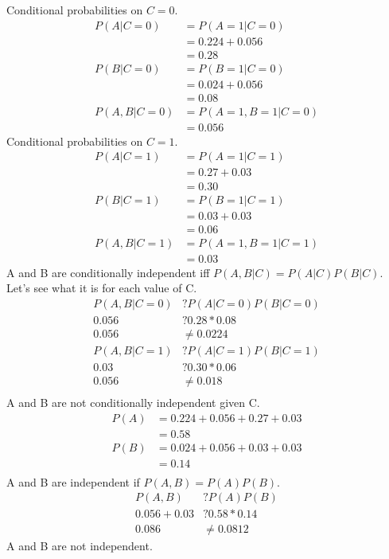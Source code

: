 \documentclass[newpage]{homework}
\begin{document}
\question
Conditional probabilities on $C=0$.
\begin{align*}
    P(A|C=0)	&=	P(A=1|C=0)  \\
                &=  0.224 + 0.056   \\
                &=  0.28    \\
    P(B|C=0)    &=	P(B=1|C=0)	\\
                &=	0.024 + 0.056	\\
                &=  0.08    \\
    P(A,B|C=0)  &=  P(A=1, B=1|C=0) \\
                &=  0.056
\end{align*}
Conditional probabilities on $C=1$.
\begin{align*}
    P(A|C=1)	&=	P(A=1|C=1)  \\
                &=  0.27 + 0.03   \\
                &=  0.30    \\
    P(B|C=1)    &=	P(B=1|C=1)	\\
                &=	0.03 + 0.03	\\
                &=  0.06    \\
    P(A,B|C=1)  &=  P(A=1, B=1|C=1) \\
                &=  0.03
\end{align*}
A and B are conditionally independent iff $P(A,B|C) = P(A|C)P(B|C)$. Let's see what it is for each value of C.
\begin{align*}
    P(A,B|C=0)	&?	P(A|C=0)P(B|C=0)	\\
    0.056	&?	0.28 * 0.08	\\
    0.056   &\neq 0.0224    \\
    P(A,B|C=1)	&?	P(A|C=1)P(B|C=1)	\\
    0.03	&?	0.30 * 0.06	\\
    0.056   &\neq 0.018    \\
\end{align*}
A and B are not conditionally independent given C.
\begin{align*}
    P(A)	&=	0.224 + 0.056 + 0.27 + 0.03	\\
            &=  0.58    \\
    P(B)    &=  0.024 + 0.056 + 0.03 + 0.03 \\
            &=  0.14    \\
\end{align*}
A and B are independent if $P(A,B) = P(A)P(B)$.
\begin{align*}
    P(A,B)	&?	P(A)P(B)	\\
    0.056 + 0.03	&?	0.58 * 0.14	\\
    0.086 &\neq 0.0812
\end{align*}
A and B are not independent.
\end{document}
